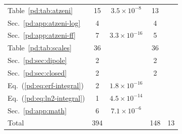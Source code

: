 \begin{longtable}{L{4.0cm}cccc}
Table~\ref*{pd:tab:atzeni} & 15 & $3.5\times10^{-8}$ & 13 & \\
Sec.~\ref*{pd:app:atzeni-log} & 4 &  & 4 & \\
Sec.~\ref*{pd:app:atzeni-ff} & 7 & $3.3\times10^{-16}$ & 5 & \\
Table~\ref*{pd:tab:scales} & 36 &  & 36 & \\
Sec.~\ref*{pd:sec:dipole} & 2 &  & 2 & \\
Sec.~\ref*{pd:sec:closed} & 2 &  & 2 & \\
Eq.~(\ref*{pd:eq:erf-integral}) & 2 & $1.8\times10^{-16}$ &  & \\
Eq.~(\ref*{pd:eq:ln2-integral}) & 1 & $4.5\times10^{-14}$ &  & \\
Sec.~\ref*{pd:app:math} & 6 & $7.1\times10^{-6}$ &  & \\
\midrule
Total & 394 & & 148 & 13\\
\end{longtable}
